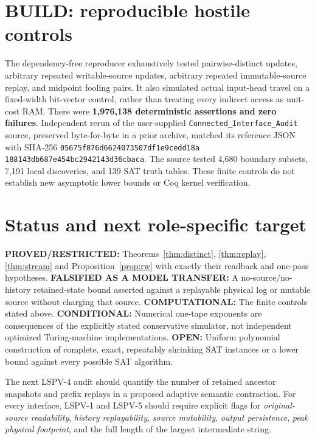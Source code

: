 \documentclass[11pt]{article}
\begin{document}
\section{BUILD: reproducible hostile controls}
The dependency-free reproducer exhaustively tested pairwise-distinct
updates, arbitrary repeated writable-source updates, arbitrary repeated
immutable-source replay, and midpoint fooling pairs.  It also simulated
actual input-head travel on a fixed-width bit-vector control, rather
than treating every indirect access as unit-cost RAM.  There were
\textbf{1,976,138 deterministic assertions and zero failures}.
Independent rerun of the user-supplied \texttt{Connected\_Interface\_Audit}
source, preserved byte-for-byte in a prior archive, matched its reference
JSON with SHA-256
\texttt{05675f876d6624073507df1e9cedd18a}\\
\texttt{188143db687e454bc2942143d36cbaca}.
The source tested 4,680 boundary subsets, 7,191 local discoveries, and
139 SAT truth tables.  These finite controls do not establish new
asymptotic lower bounds or Coq kernel verification.

\section{Status and next role-specific target}
\noindent\textbf{PROVED/RESTRICTED:} Theorems~\ref{thm:distinct},
\ref{thm:replay}, \ref{thm:stream} and Proposition~\ref{prop:rw}
with exactly their readback and one-pass hypotheses.  
\textbf{FALSIFIED AS A MODEL TRANSFER:} A no-source/no-history retained-state
bound asserted against a replayable physical log or mutable source
without charging that source.  
\textbf{COMPUTATIONAL:} The finite controls stated above.  
\textbf{CONDITIONAL:} Numerical one-tape exponents are consequences of
the explicitly stated conservative simulator, not independent optimized
Turing-machine implementations.  
\textbf{OPEN:} Uniform polynomial construction of complete, exact,
repeatably shrinking SAT instances or a lower bound against every
possible SAT algorithm.

The next LSPV-4 audit should quantify the number of retained ancestor
snapshots and prefix replays in a proposed adaptive semantic contraction.
For every interface, LSPV-1 and LSPV-5 should require explicit flags
for \emph{original-source readability}, \emph{history replayability},
\emph{source mutability}, \emph{output persistence}, \emph{peak physical
footprint}, and the full length of the largest intermediate string.
\end{document}
